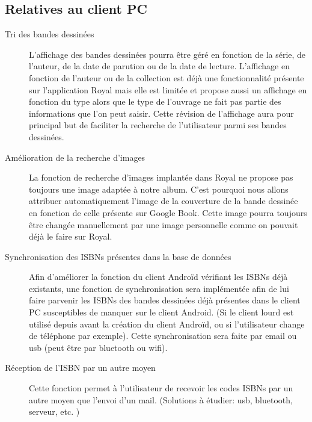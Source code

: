 \subsection{Relatives au client PC}
\begin{description}

\item[Tri des bandes dessinées]
	L'affichage des bandes dessinées pourra être géré en fonction de la série, de l'auteur, de la date de parution ou de la date de lecture. 
	L'affichage en fonction de l'auteur ou de la collection est déjà une fonctionnalité présente sur l'application Royal mais elle est limitée et propose aussi un affichage en fonction du type alors que le type de l'ouvrage ne fait pas partie des informations que l'on peut saisir. 
	Cette révision de l'affichage aura pour principal but de faciliter la recherche de l'utilisateur parmi ses bandes dessinées.

\item[Amélioration de la recherche d'images]
	La fonction de recherche d'images implantée dans Royal ne propose pas toujours une image adaptée à notre album. C'est pourquoi nous allons attribuer automatiquement l'image de la couverture de la bande dessinée en fonction de celle présente sur Google Book. 
	Cette image pourra toujours être changée manuellement par une image personnelle comme on pouvait déjà le faire sur Royal.

\item[Synchronisation des ISBNs présentes dans la base de données]
	Afin d'améliorer la fonction du client Androïd vérifiant les ISBNs déjà existants, 
	une fonction de synchronisation sera implémentée afin de lui faire parvenir les ISBNs des bandes dessinées déjà présentes dans le client PC susceptibles de manquer sur le client Android. 
	(Si le client lourd est utilisé depuis avant la création du client Androïd, ou si l'utilisateur change de téléphone par exemple). 
	Cette synchronisation sera faite par email ou usb (peut être par bluetooth ou wifi).

\item[Réception de l'ISBN par un autre moyen]
	Cette fonction permet à l'utilisateur de recevoir les codes ISBNs par un autre moyen que l'envoi d'un mail. 
	(Solutions à étudier: usb, bluetooth, serveur, etc. )

\end{description}
